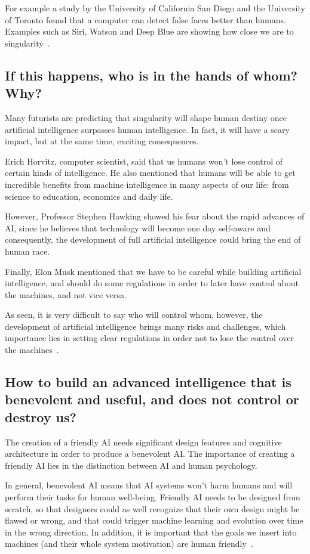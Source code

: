\documentclass[titlepage, letterpaper, fleqn]{article}
\begin{document}
For example a study by the University of California San Diego and the University of Toronto found that a computer can detect false faces better than humans.
Examples such as Siri, Watson and Deep Blue are showing how close we are to singularity~\cite{Carter15,Utopia13}.

\subsection{If this happens, who is in the hands of whom? Why?}

Many futurists are predicting that singularity will shape human destiny once artificial intelligence surpasses human intelligence.
In fact, it will have a scary impact, but at the same time, exciting consequences.

Erich Horvitz, computer scientist, said that us humans won't lose control of certain kinds of intelligence.
He also mentioned that humans will be able to get incredible benefits from machine intelligence in many aspects of our life: from science to education, economics and daily life.

However, Professor Stephen Hawking showed his fear about the rapid advances of AI, since he believes that technology will become one day self-aware and consequently, the development of full artificial intelligence could bring the end of human race.

Finally, Elon Musk mentioned that we have to be careful while building artificial intelligence, and should do some regulations in order to later have control about the machines, and not vice versa.

As seen, it is very difficult to say who will control whom, however, the development of artificial intelligence brings many risks and challenges, which importance lies in setting clear regulations in order not to lose the control over the machines~\cite{Bostron98,Bostron03}.

\subsection{How to build an advanced intelligence that is benevolent and useful, and does not control or destroy us?}

The creation of a friendly AI needs significant design features and cognitive architecture in order to produce a benevolent AI.
The importance of creating a friendly AI lies in the distinction between AI and human psychology.

In general, benevolent AI means that AI systems won't harm humans and will perform their tasks for human well-being.
Friendly AI needs to be designed from scratch, so that designers could as well recognize that their own design might be flawed or wrong, and that could trigger machine learning and evolution over time in the wrong direction.
In addition, it is important that the goals we insert into machines (and their whole system motivation) are human friendly~\cite{Yudkowsky01}. 
\end{document}
